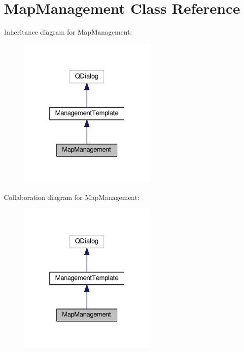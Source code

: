 \hypertarget{class_map_management}{}\section{Map\+Management Class Reference}
\label{class_map_management}


Inheritance diagram for Map\+Management\+:
\nopagebreak
\begin{figure}[H]
\begin{center}
\leavevmode
\includegraphics[width=193pt]{class_map_management__inherit__graph}
\end{center}
\end{figure}


Collaboration diagram for Map\+Management\+:
\nopagebreak
\begin{figure}[H]
\begin{center}
\leavevmode
\includegraphics[width=193pt]{class_map_management__coll__graph}
\end{center}
\end{figure}
